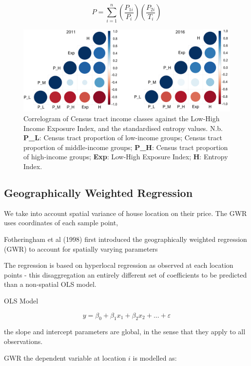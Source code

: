 \begin{equation}
    P = \sum^{n}_{i=1}(\frac{P_{1i}}{P_{i}})(\frac{P_{2i}}{T_i})
\end{equation}

\begin{figure}[H]
    \centering
    \includegraphics[width=1\textwidth]{body/figures/Entropy_CorrPlot.png}
    \caption{Correlogram of Census tract income classes against the Low-High Income Exposure Index, and the standardised entropy values. N.b. \textbf{P\_L}: Census tract proportion of low-income groups; Census tract proportion of middle-income groups; \textbf{P\_H}: Census tract proportion of high-income groups; \textbf{Exp}: Low-High Exposure Index; \textbf{H}: Entropy Index.}
    \label{fig:Correlogram}
\end{figure}

\subsection{Geographically Weighted Regression}
 We take into account spatial variance of house location on their price. The GWR uses coordinates of each sample point, 

Fotheringham et al (1998) first introduced the geographically weighted regression (GWR) to account for spatially varying parameters

The regression is based on hyperlocal regression as observed at each location points - this disaggregation an entirely different set of coefficients to be predicted than a non-spatial OLS model. 

OLS Model

\begin{equation}
    y = \beta_{0} + \beta_{1}x_{1} + \beta_{2}x_{2} + ... + \varepsilon
\end{equation}

the slope and intercept parameters are global, in the sense that they apply to all observations. 

GWR the dependent variable at location $i$ is modelled as: 

